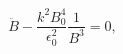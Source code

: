 \begin{equation}\label{Beql}
\ddot{B} - \frac{k^2 B_0^4}{\epsilon_0^2} \frac{1}{B^3} = 0,
\end{equation}

